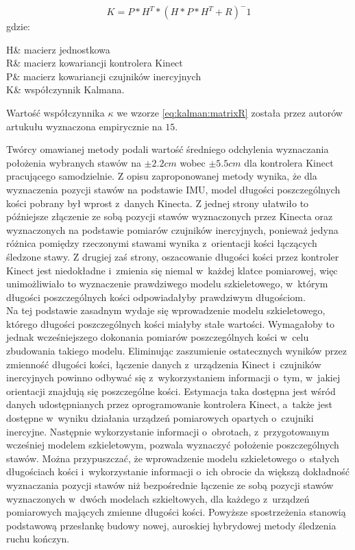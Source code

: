\begin{equation}
	K = P * H^T * (H * P * H^T +R)^-1
	\label{eq:kalman:gain}
\end{equation}
gdzie:
\begin{conditions}
	H& macierz jednostkowa\\
	R& macierz kowariancji kontrolera Kinect\\
	P& macierz kowariancji czujników inercyjnych\\
	K& współczynnik Kalmana.
\end{conditions}
		
Wartość współczynnika $\kappa$ we wzorze \eqref{eq:kalman:matrixR} została przez autorów artukułu wyznaczona empirycznie na $15$.
		
Twórcy omawianej metody podali wartość średniego odchylenia wyznaczania położenia wybranych stawów na $\pm 2.2cm$ wobec $\pm 5.5cm$ dla kontrolera Kinect pracującego samodzielnie. Z opisu zaproponowanej metody wynika, że dla wyznaczenia pozycji stawów na podstawie IMU, model długości poszczególnych kości pobrany był wprost z~danych Kinecta. Z jednej strony ułatwiło to późniejsze złączenie ze sobą pozycji stawów wyznaczonych przez Kinecta oraz wyznaczonych na podstawie pomiarów czujników inercyjnych, ponieważ jedyna różnica pomiędzy rzeczonymi stawami wynika z~orientacji kości łączących śledzone stawy. Z drugiej zaś strony, oszacowanie długości kości przez kontroler Kinect jest niedokładne i~zmienia się niemal w~każdej klatce pomiarowej, więc unimożliwiało to wyznaczenie prawdziwego modelu szkieletowego, w~którym długości poszczególnych kości odpowiadałyby prawdziwym długościom.\\
		
Na tej podstawie zasadnym wydaje się wprowadzenie modelu szkieletowego, którego długości poszczególnych kości miałyby stałe wartości. Wymagałoby to jednak wcześniejszego dokonania pomiarów poszczególnych kości w~celu zbudowania takiego modelu. Eliminując zaszumienie ostatecznych wyników przez zmienność długości kości, łączenie danych z~urządzenia Kinect i~czujników inercyjnych powinno odbywać się z~wykorzystaniem informacji o~tym, w~jakiej orientacji znajdują się poszczególne kości. Estymacja taka dostępna jest wśród danych udostępnianych przez oprogramowanie kontrolera Kinect, a~także jest dostępne w~wyniku działania urządzeń pomiarowych opartych o~czujniki inercyjne. Następnie wykorzystanie informacji o~obrotach, z~przygotowanym wcześniej modelem szkieletowym, pozwala wyznaczyć położenie poszczególnych stawów. Można przypuszczać, że wprowadzenie modelu szkieletowego o~stałych długościach kości i~wykorzystanie informacji o~ich obrocie da większą dokładność wyznaczania pozycji stawów niż bezpośrednie łączenie ze sobą pozycji stawów wyznaczonych w~dwóch modelach szkieltowych, dla każdego z~urządzeń pomiarowych mających zmienne długości kości. Powyższe spostrzeżenia stanowią podstawową przesłankę budowy nowej, auroskiej hybrydowej metody śledzenia ruchu kończyn.